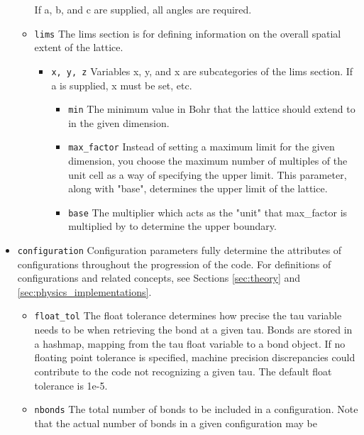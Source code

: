 \begin{itemize}
\begin{itemize}
        If a, b, and c are supplied, all angles are required.
      \item \texttt{lims}
        The lims section is for defining information on the overall spatial 
        extent of the lattice. 
        \begin{itemize}
          \item \texttt{x, y, z}
            Variables x, y, and x are subcategories of the lims section.
            If a is supplied, x must be set, etc. 
            \begin{itemize}
              \item \texttt{min}
                The minimum value in Bohr that the lattice should extend to in
                the given dimension.
              \item \texttt{max\_factor}
                Instead of setting a maximum limit for the given dimension, you
                choose the maximum number of multiples of the unit cell as a 
                way of specifying the upper limit.  
                This parameter, along with "base", determines the upper limit 
                of the lattice.
              \item \texttt{base}
                The multiplier which acts as the "unit" that max\_factor is 
                multiplied by to determine the upper boundary. 
            \end{itemize}
        \end{itemize}
    \end{itemize}
  \item \texttt{configuration}
    Configuration parameters fully determine the attributes of configurations
    throughout the progression of the code. 
    For definitions of configurations and related concepts, see Sections
    \ref{sec:theory} and \ref{sec:physics_implementations}.
    \begin{itemize}
      \item \texttt{float\_tol}
        The float tolerance determines how precise the tau variable needs to be
        when retrieving the bond at a given tau. 
        Bonds are stored in a hashmap, mapping from the tau float variable to a
        bond object. 
        If no floating point tolerance is specified, machine precision 
        discrepancies could contribute to the code not recognizing a given tau. 
        The default float tolerance is 1e-5. 
      \item \texttt{nbonds}
        The total number of bonds to be included in a configuration. 
        Note that the actual number of bonds in a given configuration may be 

\end{itemize}
\end{itemize}
